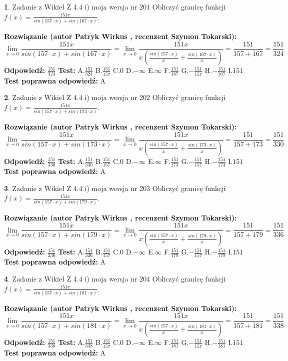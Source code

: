 \documentclass[12pt, a4paper]{article}
\theoremstyle{definition} %
\newtheorem{zad}{}
\newcommand{\zadStart}[1]{\begin{zad}#1\newline}
\newcommand{\zadStop}{\end{zad}}
\newcommand{\rozwStart}[2]{\noindent \textbf{Rozwiązanie (autor #1 , recenzent #2): }\newline}
\newcommand{\rozwStop}{\newline}
\newcommand{\odpStart}{\noindent \textbf{Odpowiedź:}\newline}
\newcommand{\odpStop}{\newline}
\newcommand{\testStart}{\noindent \textbf{Test:}\newline}
\newcommand{\testStop}{\newline}
\newcommand{\kluczStart}{\noindent \textbf{Test poprawna odpowiedź:}\newline}
\newcommand{\kluczStop}{\newline}
\begin{document}
\zadStart{Zadanie z Wikieł Z 4.4 i) moja wersja nr 201}
Obliczyć granicę funkcji $f(x)=\frac{151x}{sin(157\cdot x) +sin(167\cdot x)}$.
\zadStop
\rozwStart{Patryk Wirkus}{Szymon Tokarski}
$$\lim\limits_{x\to 0}\frac{151x}{sin(157\cdot x) +sin(167\cdot x)}=\lim\limits_{x\to 0}\frac{151x}{x(\frac{sin(157\cdot x)}{x}+\frac{sin(167\cdot x)}{x})}=\frac{151}{157+167} = \frac{151}{324}$$
\rozwStop
\odpStart
$\frac{151}{324}$
\odpStop
\testStart
A.$\frac{151}{324}$
B.$\frac{151}{157}$
C.$0$
D.$-\infty$
E.$\infty$
F.$\frac{151}{167}$
G.$-\frac{151}{157}$
H.$-\frac{151}{167}$
I.$151$
\testStop
\kluczStart
A
\kluczStop



\zadStart{Zadanie z Wikieł Z 4.4 i) moja wersja nr 202}
Obliczyć granicę funkcji $f(x)=\frac{151x}{sin(157\cdot x) +sin(173\cdot x)}$.
\zadStop
\rozwStart{Patryk Wirkus}{Szymon Tokarski}
$$\lim\limits_{x\to 0}\frac{151x}{sin(157\cdot x) +sin(173\cdot x)}=\lim\limits_{x\to 0}\frac{151x}{x(\frac{sin(157\cdot x)}{x}+\frac{sin(173\cdot x)}{x})}=\frac{151}{157+173} = \frac{151}{330}$$
\rozwStop
\odpStart
$\frac{151}{330}$
\odpStop
\testStart
A.$\frac{151}{330}$
B.$\frac{151}{157}$
C.$0$
D.$-\infty$
E.$\infty$
F.$\frac{151}{173}$
G.$-\frac{151}{157}$
H.$-\frac{151}{173}$
I.$151$
\testStop
\kluczStart
A
\kluczStop



\zadStart{Zadanie z Wikieł Z 4.4 i) moja wersja nr 203}
Obliczyć granicę funkcji $f(x)=\frac{151x}{sin(157\cdot x) +sin(179\cdot x)}$.
\zadStop
\rozwStart{Patryk Wirkus}{Szymon Tokarski}
$$\lim\limits_{x\to 0}\frac{151x}{sin(157\cdot x) +sin(179\cdot x)}=\lim\limits_{x\to 0}\frac{151x}{x(\frac{sin(157\cdot x)}{x}+\frac{sin(179\cdot x)}{x})}=\frac{151}{157+179} = \frac{151}{336}$$
\rozwStop
\odpStart
$\frac{151}{336}$
\odpStop
\testStart
A.$\frac{151}{336}$
B.$\frac{151}{157}$
C.$0$
D.$-\infty$
E.$\infty$
F.$\frac{151}{179}$
G.$-\frac{151}{157}$
H.$-\frac{151}{179}$
I.$151$
\testStop
\kluczStart
A
\kluczStop



\zadStart{Zadanie z Wikieł Z 4.4 i) moja wersja nr 204}
Obliczyć granicę funkcji $f(x)=\frac{151x}{sin(157\cdot x) +sin(181\cdot x)}$.
\zadStop
\rozwStart{Patryk Wirkus}{Szymon Tokarski}
$$\lim\limits_{x\to 0}\frac{151x}{sin(157\cdot x) +sin(181\cdot x)}=\lim\limits_{x\to 0}\frac{151x}{x(\frac{sin(157\cdot x)}{x}+\frac{sin(181\cdot x)}{x})}=\frac{151}{157+181} = \frac{151}{338}$$
\rozwStop
\odpStart
$\frac{151}{338}$
\odpStop
\testStart
A.$\frac{151}{338}$
B.$\frac{151}{157}$
C.$0$
D.$-\infty$
E.$\infty$
F.$\frac{151}{181}$
G.$-\frac{151}{157}$
H.$-\frac{151}{181}$
I.$151$
\testStop
\kluczStart
A
\kluczStop
\end{document}
